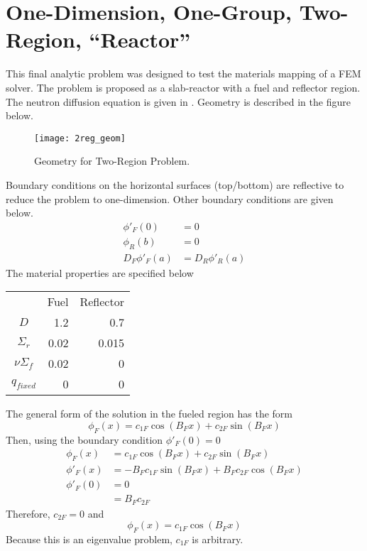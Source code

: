 \section{One-Dimension, One-Group, Two-Region, ``Reactor''}
  This final analytic problem was designed to test the materials mapping of a
  FEM solver. The problem is proposed as a slab-reactor with a fuel and 
  reflector region. The neutron diffusion equation is given in 
  . Geometry is described in the figure below.
  \begin{figure}[H] 
    \centering
    \texttt{[image: 2reg\_geom]}
    \caption{Geometry for Two-Region Problem.}
    \label{fg:2reg_geom}
  \end{figure}
  Boundary conditions on the horizontal surfaces (top/bottom) are reflective
  to reduce the problem to one-dimension. Other boundary conditions are given
  below.
  \begin{align}
    \phi'_F(0)&=0\\
    \phi_R(b)&=0\\
    D_F\phi'_F(a)&=D_R\phi'_R(a)
  \end{align}
  The material properties are specified below
  \begin{center}
  \begin{tabular}{c r r}
    & Fuel & Reflector\\
    $D$ & 1.2 & 0.7 \\
    $\Sigma_r$ & 0.02 & 0.015 \\
    $\nu \Sigma_f$ & 0.02 & 0 \\
    $q_{fixed}$ & 0 & 0
  \end{tabular}
  \end{center}
  The general form of the solution in the fueled region has the form 
  \[ \phi_F(x) = c_{1F} \cos(B_F x) + c_{2F} \sin(B_F x) \]
  Then, using the boundary condition $\phi'_F(0)=0$
  \begin{align}
    \phi_F(x) &= c_{1F} \cos(B_F x) + c_{2F} \sin(B_F x) \\
    \phi'_F(x) &= -B_F c_{1F} \sin(B_F x) + B_F c_{2F} \cos(B_F x) \\
    \phi'_F(0) &= 0\\
    &=B_F c_{2F}
  \end{align}
  Therefore, $c_{2F}=0$ and
  \begin{equation}
    \phi_F(x) = c_{1F} \cos(B_F x)
  \end{equation}
  Because this is an eigenvalue problem, $c_{1F}$ is arbitrary.
  
